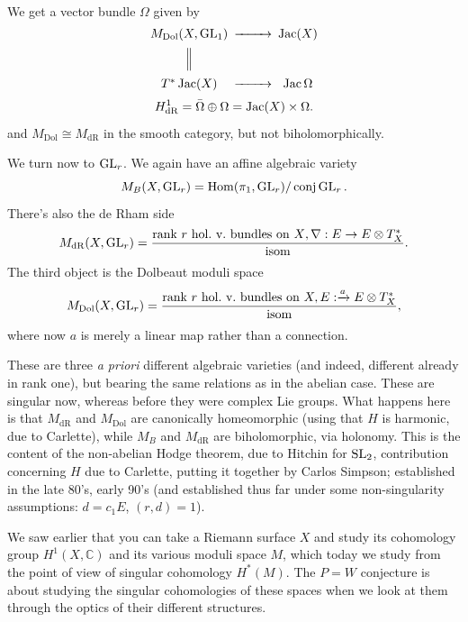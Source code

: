 \documentclass[reqno]{amsart} 
\begin{document}
We get a vector bundle $\Omega$ given by
\begin{equation*}
  \begin{CD}
    M_{\mathrm{Dol}}(X, \GL_1)    @>>>\Jac(X)\\
    @|  @. \\
    T^\ast \Jac(X) @>>> \Jac \Omega\\
  \end{CD}
\end{equation*}
\begin{equation*}
  H^1_{\mathrm{d R}} = \bar{\Omega} \oplus \Omega = \operatorname{Jac}(X) \times \Omega.
\end{equation*}
and $M_{\mathrm{Dol}} \cong M_{\mathrm{d R}}$ in the smooth category, but not biholomorphically.

We turn now to $\operatorname{GL}_r$.  We again have an affine algebraic variety
\begin{equation*}
  M_B(X, \operatorname{GL}_r) = \operatorname{Hom}(\pi_1, \operatorname{GL}_r) / \operatorname{conj} \operatorname{GL}_r.
\end{equation*}
There's also the de Rham side
\begin{equation*}
  M_{\mathrm{d R}}(X, \operatorname{GL}_r) =
  \frac{\text{rank $r$ hol.\ v.\ bundles on $X$}, \nabla : E \rightarrow E \otimes T_X^\ast}{\text{isom}}.
\end{equation*}
The third object is the Dolbeaut moduli space
\begin{equation*}
  M_{\mathrm{Dol}}(X, \operatorname{GL}_r) =
  \frac{\text{rank $r$ hol.\ v.\ bundles on } X, E : \xrightarrow{a} E \otimes T_X^\ast}{
    \text{isom}
  },
\end{equation*}
where now $a$ is merely a linear map rather than a connection.

These are three \emph{a priori} different algebraic varieties (and indeed, different already in rank one), but bearing the same relations as in the abelian case.  These are singular now, whereas before they were complex Lie groups.  What happens here is that $M_{\mathrm{d R}}$ and $M_{\mathrm{Dol}}$ are canonically homeomorphic (using that $H$ is harmonic, due to Carlette), while $M_B$ and $M_{\mathrm{d R}}$ are biholomorphic, via holonomy.  This is the content of the non-abelian Hodge theorem, due to Hitchin for $\operatorname{SL}_2$, contribution concerning $H$ due to Carlette, putting it together by Carlos Simpson; established in the late 80's, early 90's (and established thus far under some non-singularity assumptions: $d = c_1 E$, $(r, d) = 1$).

We saw earlier that you can take a Riemann surface $X$ and study its cohomology group $H^1(X, \mathbb{C})$ and its various moduli space $M$, which today we study from the point of view of singular cohomology $H^\ast(M)$.  The $P = W$ conjecture is about studying the singular cohomologies of these spaces when we look at them through the optics of their different structures.
\end{document}

